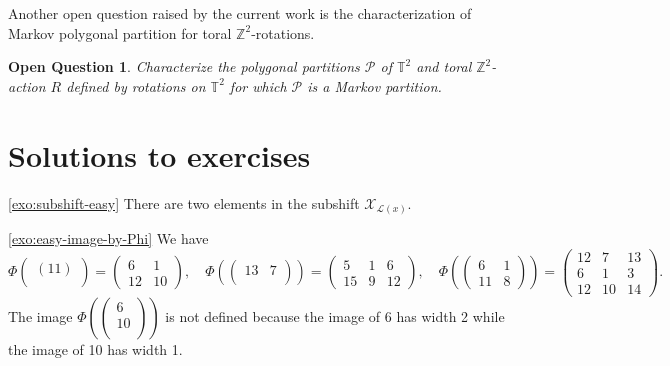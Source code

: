\documentclass[12pt]{amsart}
\newtheorem{openquestion}[definition]{Open Question}
\newcommand{\Z}{\mathbb{Z}}
\newcommand{\Lcal}{\mathcal{L}}
\newcommand{\Pcal}{\mathcal{P}}
\newcommand{\Xcal}{\mathcal{X}} %
\newcommand{\torus}{\mathbb{T}}
\begin{document}
Another open question raised by the current work is the characterization of
Markov polygonal partition for toral $\Z^2$-rotations.

\begin{openquestion}
    Characterize the polygonal partitions $\Pcal$ of $\torus^2$
    and toral $\Z^2$-action $R$ defined by rotations on $\torus^2$
    for which $\Pcal$ is a Markov partition.
\end{openquestion}

\section{Solutions to exercises}\label{sec:exosolutions}

\begin{exosolution}{\ref{exo:subshift-easy}}
    There are two elements in the subshift $\Xcal_{\Lcal(x)}$.
\end{exosolution}

\begin{exosolution}{\ref{exo:easy-image-by-Phi}}
    We have
    \[
        \Phi
    \left(\begin{smallmatrix}
        (11) \\
    \end{smallmatrix}\right)
    = 
    \left(\begin{smallmatrix}
        6 & 1 \\
        12 & 10
    \end{smallmatrix}\right)
    ,\quad
    \Phi
    \left((\begin{smallmatrix}
        13 & 7 \\
    \end{smallmatrix})\right)
    =
    \left(\begin{smallmatrix}
        5 & 1 & 6 \\
        15 & 9 & 12
    \end{smallmatrix}\right)
    ,\quad
    \Phi
    \left((\begin{smallmatrix}
    6 & 1 \\
    11 & 8
    \end{smallmatrix})\right)
    =
    \left(\begin{smallmatrix}
        12 & 7 & 13 \\
        6 & 1 & 3 \\
        12 & 10 & 14
    \end{smallmatrix}\right).
    \]
    The image $\Phi
    \left((\begin{smallmatrix}
    6 \\
    10 \\
    \end{smallmatrix})\right)$
    is not defined because
    the image of 6 has width 2 while the image of 10 has width 1.
\end{exosolution}
\end{document}

